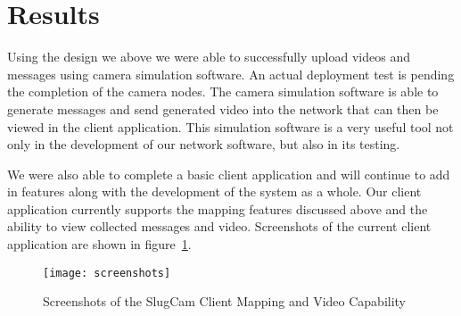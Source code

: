 \section{Results}

Using the design we above we were able to successfully upload videos and
messages using camera simulation software. An actual deployment test is pending
the completion of the camera nodes. The camera simulation software is able to
generate messages and send generated video into the network that can then be
viewed in the client application. This simulation software is a very useful tool
not only in the development of our network software, but also in its testing.

We were also able to complete a basic client application and will continue to
add in features along with the development of the system as a whole. Our client
application currently supports the mapping features discussed above and the
ability to view collected messages and video. Screenshots of the current client
application are shown in figure~\ref{fig_screens}.


\begin{figure}[!t]
\centering
\texttt{[image: screenshots]}
\caption{Screenshots of the SlugCam Client Mapping and Video Capability}
\label{fig_screens}
\end{figure}

